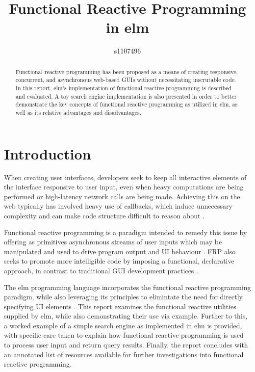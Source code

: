 \documentclass[12pt]{article}
\begin{document}
\title{Functional Reactive Programming in elm}
\author{s1107496}

\maketitle

\begin{abstract}
Functional reactive programming has been proposed as a means of 
creating responsive, concurrent, and asynchronous web-based GUIs without necessitating inscrutable code. In this report, elm's implementation of functional reactive programming
is described and evaluated. A toy search engine implementation is also
presented in order to better demonstrate the key concepts of functional
reactive programming as utilized in elm, as well as its relative advantages 
and disadvantages.
\end{abstract}



\section{Introduction}
When creating user interfaces, developers seek to keep all interactive elements of the interface responsive to user input, even when heavy computations are being performed or high-latency network calls are being made. Achieving this on the web typically has involved heavy use of callbacks, which induce unnecessary complexity and can make code structure difficult to reason about \citep{czaplicki_2012}.

Functional reactive programming is a paradigm intended to remedy this issue by offering as primitives asynchronous streams of user inputs which may be manipulated and used to drive program output and UI behaviour \citep{staltz_2014}. FRP also seeks to promote more intelligible code by imposing a functional, declarative approach, in contrast to traditional GUI development practices \citep{staltz_2014}. 

The elm programming language incorporates the functional reactive programming paradigm, while also leveraging its principles to elimintate the need for directly specifying UI elements \citep{czaplicki_chong_2013}. This report examines the functional reactive utilities supplied by elm, while also demonstrating their use via example. Further to this, a worked example of a simple search engine as implemented in elm is provided, with specific care taken to explain how functional reactive programming is used to process user input and return query results. Finally, the report concludes with an annotated list of resources available for further investigations into functional reactive programming.
\end{document}
